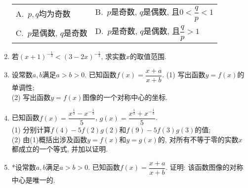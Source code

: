\documentclass[10pt,a4paper]{article}
\newcommand{\twoch}[4]{\par\begin{tabular}{p{.46\textwidth}p{.46\textwidth}}
A.~#1& B.~#2\\
C.~#3& D.~#4
\end{tabular}}
\begin{document}
\begin{enumerate}[1.]
\begin{center}
\begin{tikzpicture}[>=latex]
    \end{tikzpicture}
\end{center}
\twoch{$p,q$均为奇数}{$p$是奇数, $q$是偶数, 且$0<\dfrac qp<1$}{$p$是偶数, $q$是奇数}{$p$是奇数, $q$是偶数, 且$\dfrac qp>1$}
\item 若$(x+1)^{-\frac 13}<(3-2x)^{-\frac 13}$, 求实数$x$的取值范围.
\item 设常数$a,b$满足$a>b>0$. 已知函数$f(x)=\dfrac{x+a}{x+b}$.
(1) 写出函数$y=f(x)$的单调性;\\
(2) 写出函数$y=f(x)$图像的一个对称中心的坐标.
\item 已知函数$f(x)=\dfrac{x^{\frac 13}-x^{-\frac 13}}5$, $g(x)=\dfrac{x^{\frac 13}+x^{-\frac 13}}5$.\\
(1) 分别计算$f(4)-5f(2)g(2)$和$f(9)-5f(3)g(3)$的值;\\
(2) 由(1)概括出涉及函数$y=f(x)$和$y=g(x)$的, 对所有不等于零的实数$x$都成立的一个等式, 并加以证明.
\item *设常数$a,b$满足$a>b>0$. 已知函数$f(x)=\dfrac{x+a}{x+b}$. 证明: 该函数图像的对称中心是唯一的.



\end{enumerate}
\end{document}
